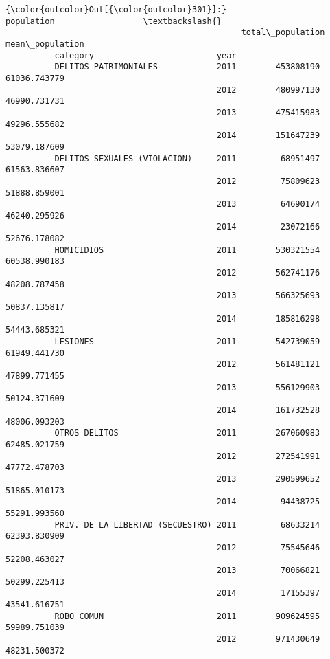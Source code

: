 \documentclass[11pt]{article}
\begin{document}
\begin{Verbatim}[commandchars=\\\{\}]
{\color{outcolor}Out[{\color{outcolor}301}]:}                                             population                  \textbackslash{}
                                                total\_population mean\_population   
          category                         year                                    
          DELITOS PATRIMONIALES            2011        453808190    61036.743779   
                                           2012        480997130    46990.731731   
                                           2013        475415983    49296.555682   
                                           2014        151647239    53079.187609   
          DELITOS SEXUALES (VIOLACION)     2011         68951497    61563.836607   
                                           2012         75809623    51888.859001   
                                           2013         64690174    46240.295926   
                                           2014         23072166    52676.178082   
          HOMICIDIOS                       2011        530321554    60538.990183   
                                           2012        562741176    48208.787458   
                                           2013        566325693    50837.135817   
                                           2014        185816298    54443.685321   
          LESIONES                         2011        542739059    61949.441730   
                                           2012        561481121    47899.771455   
                                           2013        556129903    50124.371609   
                                           2014        161732528    48006.093203   
          OTROS DELITOS                    2011        267060983    62485.021759   
                                           2012        272541991    47772.478703   
                                           2013        290599652    51865.010173   
                                           2014         94438725    55291.993560   
          PRIV. DE LA LIBERTAD (SECUESTRO) 2011         68633214    62393.830909   
                                           2012         75545646    52208.463027   
                                           2013         70066821    50299.225413   
                                           2014         17155397    43541.616751   
          ROBO COMUN                       2011        909624595    59989.751039   
                                           2012        971430649    48231.500372   

\end{Verbatim}
\end{document}
